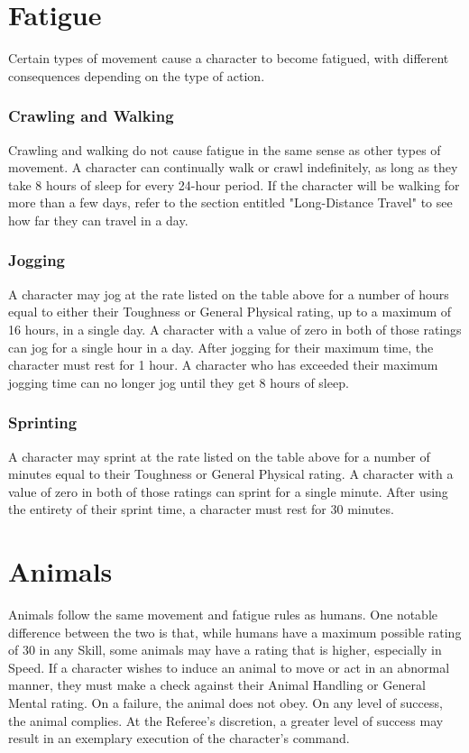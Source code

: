 \documentclass[oneside]{book}
\begin{document}
\begin{multicols}{2}
\section{Fatigue}
Certain types of movement cause a character to become fatigued, with different consequences depending on the type of action. 

\subsubsection{Crawling and Walking}
Crawling and walking do not cause fatigue in the same sense as other types of movement. A character can continually walk or crawl indefinitely, as long as they take 8 hours of sleep for every 24-hour period. If the character will be walking for more than a few days, refer to the section entitled "Long-Distance Travel" to see how far they can travel in a day.

\subsubsection{Jogging}
A character may jog at the rate listed on the table above for a number of hours equal to either their Toughness or General Physical rating, up to a maximum of 16 hours, in a single day. A character with a value of zero in both of those ratings can jog for a single hour in a day. After jogging for their maximum time, the character must rest for 1 hour. A character who has exceeded their maximum jogging time can no longer jog until they get 8 hours of sleep. 

\subsubsection{Sprinting}
A character may sprint at the rate listed on the table above for a number of minutes equal to their Toughness or General Physical rating. A character with a value of zero in both of those ratings can sprint for a single minute. After using the entirety of their sprint time, a character must rest for 30 minutes. 

\section{Animals}
Animals follow the same movement and fatigue rules as humans. One notable difference between the two is that, while humans have a maximum possible rating of 30 in any Skill, some animals may have a rating that is higher, especially in Speed. If a character wishes to induce an animal to move or act in an abnormal manner, they must make a check against their Animal Handling or General Mental rating. On a failure, the animal does not obey. On any level of success, the animal complies. At the Referee's discretion, a greater level of success may result in an exemplary execution of the character's command. 


\end{multicols}
\end{document}
